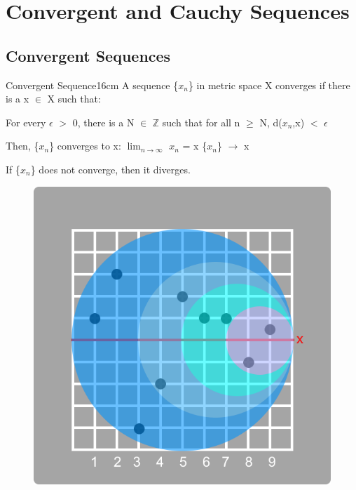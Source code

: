 \newpage

\section[Day 8: Convergence \& Cauchy]{ Convergent and Cauchy Sequences }

\subsection{ Convergent Sequences }

    \begin{definition}{Convergent Sequence}{16cm}
        A sequence \{$x_n$\} in metric space X {\color{lblue} converges} if
        there is a x $\in$ X such that:

        \hspace{1cm}
        For every $\epsilon$ $>$ 0, there is a N $\in$ $\mathbb{Z}$ such that
        for all n $\geq$ N, d($x_n$,x) $<$ $\epsilon$
        
        Then, \{$x_n$\} converges to x:
        \hspace{1cm}
        $\lim_{n \rightarrow \infty}$ $x_n$ = x
        \hspace{1cm}
        \{$x_n$\} $\rightarrow$ x

        If \{$x_n$\} does not converge, then it diverges.
    \end{definition}



    \begin{figure}[h]
        \centering
        \includegraphics[scale=0.3]{Images/8.1.1.png}
    \end{figure}



